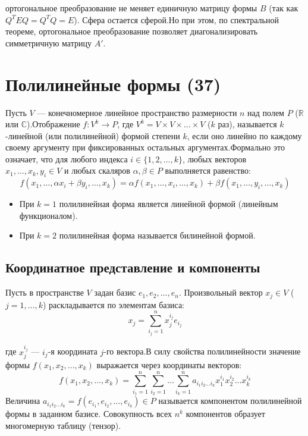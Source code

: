 \documentclass[14pt]{extreport}
\begin{document}
    ортогональное преобразование не меняет единичную матрицу формы $B$ (так как $Q^T E Q = Q^T Q = E$). Сфера остается сферой.Но при этом, по спектральной теореме, ортогональное преобразование позволяет диагонализировать симметричную матрицу $A'$.


    \chapter{Полилинейные формы (37)}

    \begin{defbox}
        Пусть $V$ — конечномерное линейное пространство размерности $n$ над полем $P$ ($\mathbb{R}$ или $\mathbb{C}$).Отображение $f: V^k \to P$, где $V^k = V \times V \times \dots \times V$ ($k$ раз), называется $k$-линейной (или полилинейной) формой степени $k$, если оно линейно по каждому своему аргументу при фиксированных остальных аргументах.Формально это означает, что для любого индекса $i \in \{1, 2, \dots, k\}$, любых векторов $x_1, \dots, x_k, y_i \in V$ и любых скаляров $\alpha, \beta \in P$ выполняется равенство:$$f(x_1, \dots, \alpha x_i + \beta y_i, \dots, x_k) = \alpha f(x_1, \dots, x_i, \dots, x_k) + \beta f(x_1, \dots, y_i, \dots, x_k)$$

        \begin{itemize}
            \item При $k=1$ полилинейная форма является линейной формой (линейным функционалом).
            \item При $k=2$ полилинейная форма называется билинейной формой.
        \end{itemize}
    \end{defbox}


    \section{Координатное представление и компоненты}

    Пусть в пространстве $V$ задан базис $e_1, e_2, \dots, e_n$. Произвольный вектор $x_j \in V$ ($j = 1, \dots, k$) раскладывается по элементам базиса:$$x_j = \sum_{i_j=1}^n x_{j}^{i_j} e_{i_j}$$

    где $x_{j}^{i_j}$ — $i_j$-я координата $j$-го вектора.В силу свойства полилинейности значение формы $f(x_1, x_2, \dots, x_k)$ выражается через координаты векторов:$$f(x_1, x_2, \dots, x_k) = \sum_{i_1=1}^n \sum_{i_2=1}^n \dots \sum_{i_k=1}^n a_{i_1 i_2 \dots i_k} x_1^{i_1} x_2^{i_2} \dots x_k^{i_k}$$Величина $a_{i_1 i_2 \dots i_k} = f(e_{i_1}, e_{i_2}, \dots, e_{i_k}) \in P$ называется компонентом полилинейной формы в заданном базисе. Совокупность всех $n^k$ компонентов образует многомерную таблицу (тензор).
\end{document}
